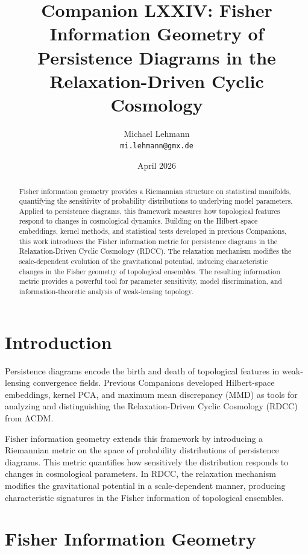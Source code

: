 \documentclass[11pt,a4paper]{article}
\title{\textbf{Companion LXXIV: Fisher Information Geometry of Persistence Diagrams in the Relaxation-Driven Cyclic Cosmology}}
\author{Michael Lehmann \\ \texttt{mi.lehmann@gmx.de}}
\date{April 2026}
\begin{document}
\maketitle

\begin{abstract}
Fisher information geometry provides a Riemannian structure on statistical 
manifolds, quantifying the sensitivity of probability distributions to underlying 
model parameters. Applied to persistence diagrams, this framework measures how 
topological features respond to changes in cosmological dynamics. Building on the 
Hilbert-space embeddings, kernel methods, and statistical tests developed in 
previous Companions, this work introduces the Fisher information metric for 
persistence diagrams in the Relaxation-Driven Cyclic Cosmology (RDCC). The 
relaxation mechanism modifies the scale-dependent evolution of the gravitational 
potential, inducing characteristic changes in the Fisher geometry of topological 
ensembles. The resulting information metric provides a powerful tool for 
parameter sensitivity, model discrimination, and information-theoretic analysis of 
weak-lensing topology.
\end{abstract}
\section{Introduction}

Persistence diagrams encode the birth and death of topological features in weak-
lensing convergence fields. Previous Companions developed Hilbert-space embeddings, 
kernel PCA, and maximum mean discrepancy (MMD) as tools for analyzing and 
distinguishing the Relaxation-Driven Cyclic Cosmology (RDCC) from ΛCDM.

Fisher information geometry extends this framework by introducing a Riemannian 
metric on the space of probability distributions of persistence diagrams. This 
metric quantifies how sensitively the distribution responds to changes in 
cosmological parameters. In RDCC, the relaxation mechanism modifies the 
gravitational potential in a scale-dependent manner, producing characteristic 
signatures in the Fisher information of topological ensembles.
\section{Fisher Information Geometry}
\end{document}
